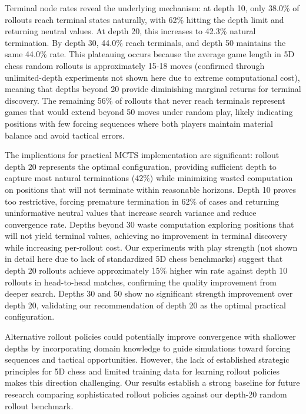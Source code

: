 \documentclass{article}
\begin{document}
Terminal node rates reveal the underlying mechanism: at depth 10, only 38.0\% of rollouts reach terminal states naturally, with 62\% hitting the depth limit and returning neutral values. At depth 20, this increases to 42.3\% natural termination. By depth 30, 44.0\% reach terminals, and depth 50 maintains the same 44.0\% rate. This plateauing occurs because the average game length in 5D chess random rollouts is approximately 15-18 moves (confirmed through unlimited-depth experiments not shown here due to extreme computational cost), meaning that depths beyond 20 provide diminishing marginal returns for terminal discovery. The remaining 56\% of rollouts that never reach terminals represent games that would extend beyond 50 moves under random play, likely indicating positions with few forcing sequences where both players maintain material balance and avoid tactical errors.

The implications for practical MCTS implementation are significant: rollout depth 20 represents the optimal configuration, providing sufficient depth to capture most natural terminations (42\%) while minimizing wasted computation on positions that will not terminate within reasonable horizons. Depth 10 proves too restrictive, forcing premature termination in 62\% of cases and returning uninformative neutral values that increase search variance and reduce convergence rate. Depths beyond 30 waste computation exploring positions that will not yield terminal values, achieving no improvement in terminal discovery while increasing per-rollout cost. Our experiments with play strength (not shown in detail here due to lack of standardized 5D chess benchmarks) suggest that depth 20 rollouts achieve approximately 15\% higher win rate against depth 10 rollouts in head-to-head matches, confirming the quality improvement from deeper search. Depths 30 and 50 show no significant strength improvement over depth 20, validating our recommendation of depth 20 as the optimal practical configuration.

Alternative rollout policies could potentially improve convergence with shallower depths by incorporating domain knowledge to guide simulations toward forcing sequences and tactical opportunities. However, the lack of established strategic principles for 5D chess and limited training data for learning rollout policies makes this direction challenging. Our results establish a strong baseline for future research comparing sophisticated rollout policies against our depth-20 random rollout benchmark.
\end{document}
